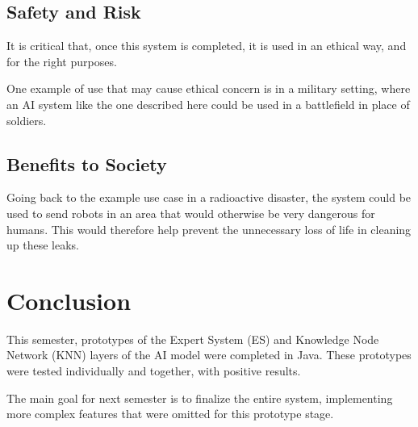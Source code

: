 \documentclass[titlepage,11pt]{article}
\begin{document}
\subsection{Safety and Risk}

It is critical that, once this system is completed, it is used in an ethical way, and for the right purposes.

One example of use that may cause ethical concern is in a military setting, where an AI system like the one described here could be used in a battlefield in place of soldiers.

\subsection{Benefits to Society}

Going back to the example use case in a radioactive disaster, the system could be used to send robots in an area that would otherwise be very dangerous for humans. This would therefore help prevent the unnecessary loss of life in cleaning up these leaks.

\section{Conclusion}

This semester, prototypes of the Expert System (ES) and Knowledge Node Network (KNN) layers of the AI model were completed in Java. These prototypes were tested individually and together, with positive results.

The main goal for next semester is to finalize the entire system, implementing more complex features that were omitted for this prototype stage.

\clearpage

{}

\end{document}
